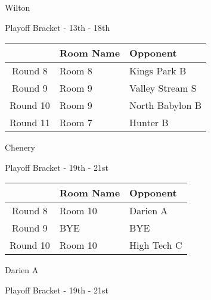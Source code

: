 \documentclass{article}%
\begin{document}
\vspace*{80pt}%
\linebreak%
\newpage%
\begin{center}%
\begin{Huge}%
Wilton%
\end{Huge}%
\vspace*{12pt}%
\linebreak%
\begin{Large}%
Playoff Bracket {-} 13th {-} 18th%
\end{Large}%
\end{center}%
\vspace*{4pt}%
%
\begin{tabularx}{\textwidth}{|c|Y|Y|}%
\hline%
&Room Name&Opponent\\%
\hline%
Round 8&Room 8&Kings Park B\\%
Round 9&Room 9&Valley Stream S\\%
Round 10&Room 9&North Babylon B\\%
Round 11&Room 7&Hunter B\\%
\hline%
\end{tabularx}%
\vspace*{80pt}%
\linebreak%
\newpage%
\begin{center}%
\begin{Huge}%
Chenery%
\end{Huge}%
\vspace*{12pt}%
\linebreak%
\begin{Large}%
Playoff Bracket {-} 19th {-} 21st%
\end{Large}%
\end{center}%
\vspace*{4pt}%
%
\begin{tabularx}{\textwidth}{|c|Y|Y|}%
\hline%
&Room Name&Opponent\\%
\hline%
Round 8&Room 10&Darien A\\%
Round 9&BYE&BYE\\%
Round 10&Room 10&High Tech C\\%
\hline%
\end{tabularx}%
\vspace*{80pt}%
\linebreak%
\newpage%
\begin{center}%
\begin{Huge}%
Darien A%
\end{Huge}%
\vspace*{12pt}%
\linebreak%
\begin{Large}%
Playoff Bracket {-} 19th {-} 21st%
\end{Large}%
\end{center}%
\end{document}
